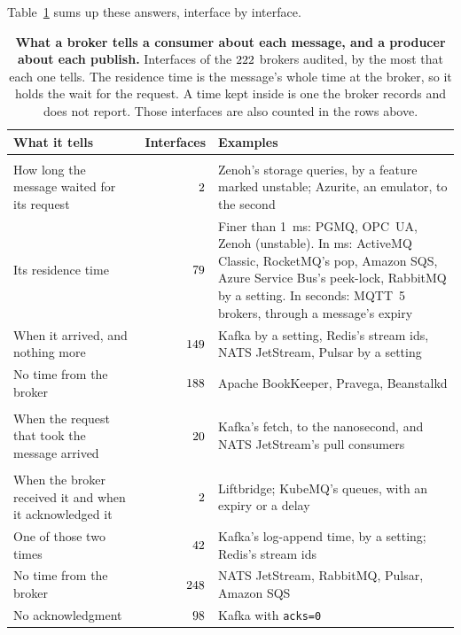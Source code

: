 \documentclass[10pt,journal,onecolumn]{IEEEtran}
\newcommand{\kafka}{Kafka}
\newcommand{\redis}{Redis}
\begin{document}
Table~\ref{stab:brokers} sums up these answers, interface by interface.

\begin{table}[tb]
\caption{\textbf{What a broker tells a consumer about each message, and a producer about each
publish.} Interfaces of the $222$ brokers audited, by the most that each one tells. The
residence time is the message's whole time at the broker, so it holds the wait for the request. A
time kept inside is one the broker records and does not report. Those interfaces are also counted
in the rows above.}
\label{stab:brokers}
\centering
\footnotesize
\setlength{\tabcolsep}{3pt}
\begin{tabular}{@{}>{\raggedright\arraybackslash}p{}r>{\raggedright\arraybackslash}p{}@{}}
\toprule
What it tells & Interfaces & Examples \\
\midrule
\multicolumn{3}{@{}l}{\emph{To a consumer, with each message}} \\
How long the message waited for its request & $2$ & Zenoh's storage queries, by a
feature marked unstable; Azurite, an emulator, to the second \\
Its residence time & $79$ & Finer than 1~ms: PGMQ, OPC~UA, Zenoh (unstable). In ms:
ActiveMQ Classic, RocketMQ's pop, Amazon SQS, Azure Service Bus's peek-lock, RabbitMQ by a setting. In seconds:
MQTT~5 brokers, through a message's expiry \\
When it arrived, and nothing more & $149$ & \kafka{} by a setting, \redis{}'s stream ids,
NATS JetStream, Pulsar by a setting \\
No time from the broker & $188$ & Apache BookKeeper, Pravega, Beanstalkd \\
\addlinespace[2pt]
\multicolumn{3}{@{}l}{\emph{Kept inside, and not reported to the consumer}} \\
When the request that took the message arrived & $20$ & \kafka{}'s fetch, to the
nanosecond, and NATS JetStream's pull consumers \\
\addlinespace[2pt]
\multicolumn{3}{@{}l}{\emph{To a producer, in the acknowledgment of a publish}} \\
When the broker received it and when it acknowledged it & $2$ & Liftbridge; KubeMQ's
queues, with an expiry or a delay \\
One of those two times & $42$ & \kafka{}'s log-append time, by a setting; \redis{}'s
stream ids \\
No time from the broker & $248$ & NATS JetStream, RabbitMQ, Pulsar, Amazon SQS \\
No acknowledgment & $98$ & \kafka{} with \texttt{acks=0} \\
\bottomrule
\end{tabular}
\end{table}
\end{document}

